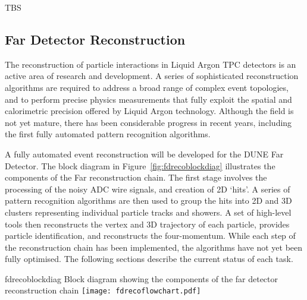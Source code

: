 TBS

\subsection{Far Detector Reconstruction}
\label{sec:detectors-sc-physics-software-reconstruction-fd}

The reconstruction of particle interactions in Liquid Argon TPC
detectors is an active area of research and development.
A series of sophisticated reconstruction algorithms are required to
address a broad range of complex event topologies, and to perform
precise physics measurements that fully exploit the spatial and 
calorimetric precision offered by Liquid Argon technology.
Although the field is not yet mature, there has been considerable
progress in recent years, including the first fully automated
pattern recognition algorithms. 

A fully automated event reconstruction will be developed for the
DUNE Far Detector. The block diagram in Figure~\ref{fig:fdrecoblockdiag}
illustrates the components of the Far reconstruction chain. 
The first stage involves the processing of the noisy ADC wire signals,
and creation of 2D `hits'. A series of pattern recognition algorithms
are then used to group the hits into 2D and 3D clusters representing 
individual particle tracks and showers. A set of high-level tools
then reconstructs the vertex and 3D trajectory of each particle,
provides particle identification, and reconstructs the four-momentum.
While each step of the reconstruction chain has been implemented,
the algorithms have not yet been fully optimised.
The following sections describe the current status of each task.


\begin{cdrfigure}{fdrecoblockdiag}
{Block diagram showing the components of the far detector reconstruction chain}
\texttt{[image: fdrecoflowchart.pdf]}
\end{cdrfigure}


